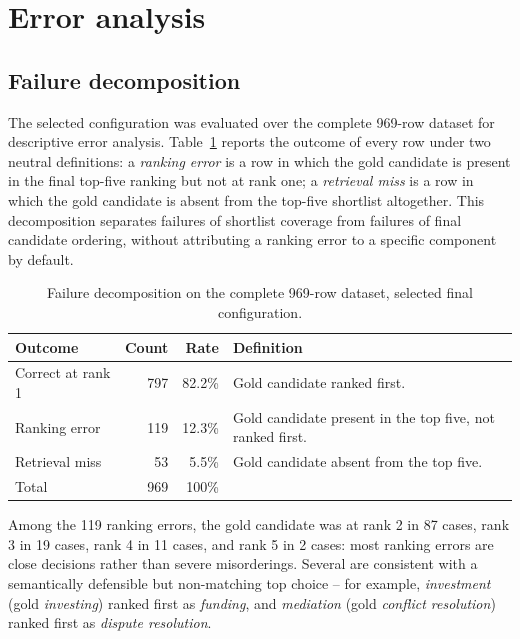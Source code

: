 \section{Error analysis}
\label{sec:error-analysis}

\subsection{Failure decomposition}

The selected configuration was evaluated over the complete 969-row dataset for descriptive error analysis. Table~\ref{tab:failure-decomposition} reports the outcome of every row under two neutral definitions: a \emph{ranking error} is a row in which the gold candidate is present in the final top-five ranking but not at rank one; a \emph{retrieval miss} is a row in which the gold candidate is absent from the top-five shortlist altogether. This decomposition separates failures of shortlist coverage from failures of final candidate ordering, without attributing a ranking error to a specific component by default.

\begingroup
\footnotesize
\begin{table}[htbp]
\centering
\begin{tabular}{lrrp{5.4cm}}
\toprule
\textbf{Outcome} & \textbf{Count} & \textbf{Rate} & \textbf{Definition}\\
\midrule
Correct at rank 1 & 797 & 82.2\% & Gold candidate ranked first.\\
Ranking error & 119 & 12.3\% & Gold candidate present in the top five, not ranked first.\\
Retrieval miss & 53 & 5.5\% & Gold candidate absent from the top five.\\
\midrule
Total & 969 & 100\% & \\
\bottomrule
\end{tabular}
\caption{Failure decomposition on the complete 969-row dataset, selected final configuration.}
\label{tab:failure-decomposition}
\end{table}
\endgroup

Among the 119 ranking errors, the gold candidate was at rank 2 in 87 cases, rank 3 in 19 cases, rank 4 in 11 cases, and rank 5 in 2 cases: most ranking errors are close decisions rather than severe misorderings. Several are consistent with a semantically defensible but non-matching top choice -- for example, \emph{investment} (gold \emph{investing}) ranked first as \emph{funding}, and \emph{mediation} (gold \emph{conflict resolution}) ranked first as \emph{dispute resolution}.


